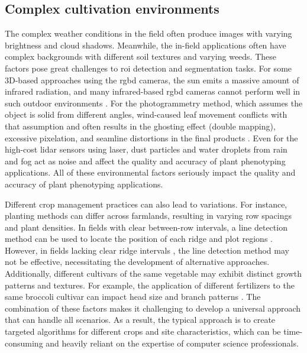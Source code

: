 \subsection{Complex cultivation environments} \label{sec:complexenv}
The complex weather conditions in the field often produce images with varying brightness and cloud shadows. Meanwhile, the in-field applications often have complex backgrounds with different soil textures and varying weeds. These factors pose great challenges to \gls{roi} detection and segmentation tasks. For some 3D-based approaches using the \gls{rgbd} cameras, the sun emits a massive amount of infrared radiation, and many infrared-based \gls{rgbd} cameras cannot perform well in such outdoor environments \citep{tolgyessy_evaluation_2021}. For the photogrammetry method, which assumes the object is solid from different angles, wind-caused leaf movement conflicts with that assumption and often results in the ghosting effect (double mapping), excessive pixelation, and seamline distortions in the final products \citep{duan_comparison_2017,lin_new_2021}. Even for the high-cost \gls{lidar} sensors using laser, dust particles and water droplets from rain and fog act as noise and affect the quality and accuracy of plant phenotyping applications. All of these environmental factors seriously impact the quality and accuracy of plant phenotyping applications.

Different crop management practices can also lead to variations. For instance, planting methods can differ across farmlands, resulting in varying row spacings and plant densities. In fields with clear between-row intervals, a line detection method can be used to locate the position of each ridge and plot regions \citep[Fig.~1]{tresch_easympe_2019}. However, in fields lacking clear ridge intervals \citep[Fig.~3]{faye_toolbox_2016}, the line detection method may not be effective, necessitating the development of alternative approaches. Additionally, different cultivars of the same vegetable may exhibit distinct growth patterns and textures. For example, the application of different fertilizers to the same broccoli cultivar can impact head size and branch patterns \citep{nishida_estimation_2023}. The combination of these factors makes it challenging to develop a universal approach that can handle all scenarios. As a result, the typical approach is to create targeted algorithms for different crops and site characteristics, which can be time-consuming and heavily reliant on the expertise of computer science professionals.

